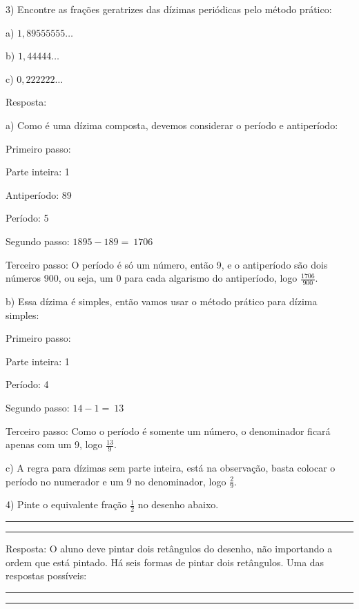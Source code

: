 3) Encontre as frações geratrizes das dízimas periódicas pelo método
prático:

a) \(1,89555555\ldots\)

b) \(1,44444\ldots\)

c) \(0,222222\ldots\)

Resposta:

a) Como é uma dízima composta, devemos considerar o período e
antiperíodo:

Primeiro passo:

Parte inteira: 1

Antiperíodo: 89

Período: 5

Segundo passo: \(1895 - 189 = \ 1706\)

Terceiro passo: O período é só um número, então 9, e o antiperíodo são
dois números 900, ou seja, um 0 para cada algarismo do antiperíodo, logo
\(\frac{1706}{900}\).

b) Essa dízima é simples, então vamos usar o método prático para dízima
simples:

Primeiro passo:

Parte inteira: 1

Período: 4

Segundo passo: \(14 - 1 = \ 13\)

Terceiro passo: Como o período é somente um número, o denominador ficará
apenas com um 9, logo \(\frac{13}{9}\).

c) A regra para dízimas sem parte inteira, está na observação, basta
colocar o período no numerador e um 9 no denominador, logo
\(\frac{2}{9}\).

4) Pinte o equivalente fração \(\frac{1}{2}\) no desenho abaixo.

\begin{center}\rule{0.5\linewidth}{0.5pt}\end{center}

\begin{center}\rule{0.5\linewidth}{0.5pt}\end{center}

Resposta: O aluno deve pintar dois retângulos do desenho, não importando
a ordem que está pintado. Há seis formas de pintar dois retângulos. Uma
das respostas possíveis:

\begin{center}\rule{0.5\linewidth}{0.5pt}\end{center}

\begin{center}\rule{0.5\linewidth}{0.5pt}\end{center}

